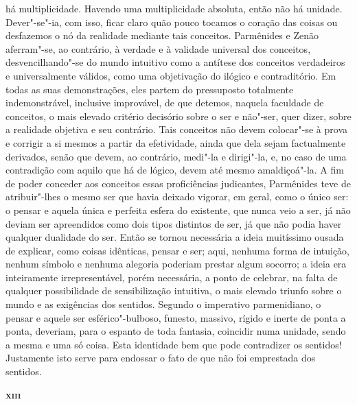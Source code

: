 há multiplicidade. Havendo uma multiplicidade absoluta, então não há unidade.
Dever"-se"-ia, com isso, ficar claro quão pouco tocamos o coração das coisas
ou desfazemos o nó da realidade mediante tais conceitos. Parmênides e Zenão
aferram"-se, ao contrário, à verdade e à validade universal dos conceitos,
desvencilhando"-se do mundo intuitivo como a antítese dos conceitos
verdadeiros e universalmente válidos, como uma objetivação do ilógico e
contraditório. Em todas as suas demonstrações, eles partem do pressuposto
totalmente indemonstrável, inclusive improvável, de que detemos, naquela
faculdade de conceitos, o mais elevado critério decisório sobre o ser e
não"-ser, quer dizer, sobre a realidade objetiva e seu contrário. Tais
conceitos não devem colocar"-se à prova e corrigir a si mesmos a partir da
efetividade, ainda que dela sejam factualmente derivados, senão que devem, ao
contrário, medi"-la e dirigi"-la, e, no caso de uma contradição com aquilo
que há de lógico, devem até mesmo amaldiçoá"-la. A fim de poder conceder aos
conceitos essas proficiências judicantes, Parmênides teve de atribuir"-lhes o
mesmo ser que havia deixado vigorar, em geral, como o único ser: o pensar e
aquela única e perfeita esfera do existente, que nunca veio a ser, já não
deviam ser apreendidos como dois tipos distintos de ser, já que não podia
haver qualquer dualidade do ser. Então se tornou necessária a ideia
muitíssimo ousada de explicar, como coisas idênticas, pensar e ser; aqui,
nenhuma forma de intuição, nenhum símbolo e nenhuma alegoria poderiam prestar
algum socorro; a ideia era inteiramente irrepresentável, porém necessária, a
ponto de celebrar, na falta de qualquer possibilidade de sensibilização
intuitiva, o mais elevado triunfo sobre o mundo e as exigências dos sentidos.
Segundo o imperativo parmenidiano, o pensar e aquele ser esférico"-bulboso,
funesto, massivo, rígido e inerte de ponta a ponta, deveriam, para o espanto
de toda fantasia, coincidir numa unidade, sendo a mesma e uma só coisa. Esta
identidade bem que pode contradizer os sentidos! Justamente isto serve para
endossar o fato de que não foi emprestada dos sentidos. 

\bigskip
\textsc{\textbf{xiii}}
\bigskip

